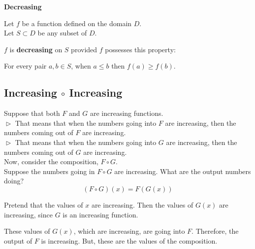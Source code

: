 \documentclass{ximera}
\begin{document}
\begin{summary} \textbf{\textcolor{green!50!black}{Decreasing}} 


Let $f$ be a function defined on the domain $D$. \\
Let $S \subset D$ be any subset of $D$.

$f$ is \textbf{decreasing} on $S$ provided $f$ possesses this property:  


\begin{center}
For every pair $a, b \in S$, when $a \leq b$ then $f(a) \geq f(b)$.
\end{center}

\end{summary}











\subsection{Increasing $\circ$ Increasing}


Suppose that both $F$ and $G$ are increasing functions. \\

$\vartriangleright$ That means that when the numbers going into $F$ are increasing, then the numbers coming out of $F$ are increasing. \\

$\vartriangleright$ That means that when the numbers going into $G$ are increasing, then the numbers coming out of $G$ are increasing. \\



Now, consider the composition, $F \circ G$. \\


Suppose the numbers going in $F \circ G$ are increasing.  What are the output numbers doing? \\




\[ (F \circ G)(x) = F(G(x)) \]


Pretend that the values of $x$ are increasing. Then the values of $G(x)$ are increasing, since $G$ is an increasing function.

These values of $G(x)$, which are increasing, are going into $F$.  Therefore, the output of $F$ is increasing.  But, these are the values of the composition.
\end{document}
